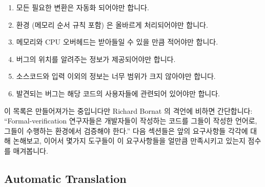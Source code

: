 \begin{enumerate}
\item	모든 필요한 변환은 자동화 되어야만 합니다.
\item	환경 (메모리 순서 규칙 포함) 은 올바르게 처리되어야만 합니다.
\item	메모리와 CPU 오버헤드는 받아들일 수 있을 만큼 적어야만 합니다.
\item	버그의 위치를 알려주는 정보가 제공되어야만 합니다.
\item	소스코드와 입력 이외의 정보는 너무 범위가 크지 않아야만 합니다.
\item	발견되는 버그는 해당 코드의 사용자들에 관련되어 있어야만 합니다.
\iffalse

\item	Any required translation must be automated.
\item	The environment (including memory ordering) must be correctly
	handled.
\item	The memory and CPU overhead must be acceptably modest.
\item	Specific information leading to the location of the bug
	must be provided.
\item	Information beyond the source code and inputs must be
	modest in scope.
\item	The bugs located must be relevant to the code's users.
\fi
\end{enumerate}

이 목록은 만들어져가는 중입니다만 Richard Bornat 의 격언에 비하면 간단합니다:
``Formal-verification 연구자들은 개발자들이 작성하는 코드를 그들이 작성한
언어로, 그들이 수행하는 환경에서 검증해야 한다.''
다음 섹션들은 앞의 요구사항들 각각에 대해 논해보고, 이어서 몇가지 도구들이 이
요구사항들을 얼만큼 만족시키고 있는지 점수를 매겨봅니다.
\iffalse

This list builds on, but is somewhat more modest than, Richard Bornat's
dictum: ``Formal-verification researchers should verify the code that
developers write, in the language they write it in, running in the
environment that it runs in, as they write it.''
The following sections discuss each of the above requirements, followed
by a section presenting a scorecard of how well a few tools stack up
against these requirements.
\fi

\subsection{Automatic Translation}
\label{sec:future:Automatic Translation}

